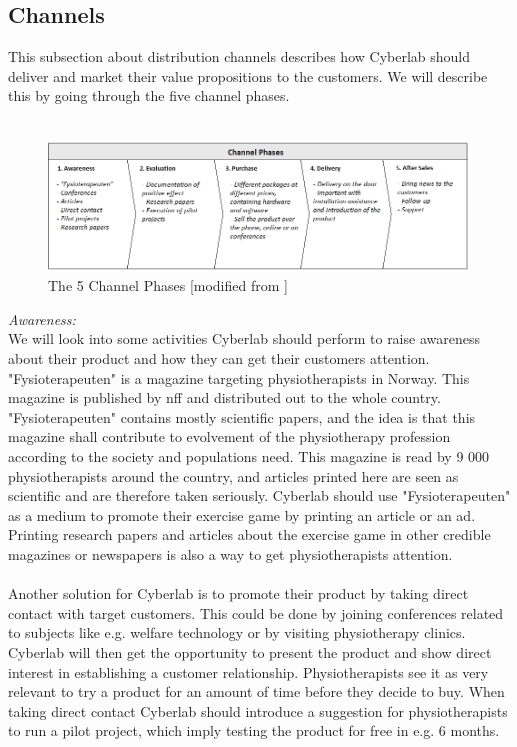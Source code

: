\subsection{Channels}
This subsection about distribution channels describes how Cyberlab should deliver and market their value propositions to the customers. We will describe this by going through the five channel phases.\\ \\
\begin{figure}
\label{fig:Channels}
\begin{center}
\includegraphics[angle=90,scale=0.7]{channels}
\caption[Channels]{The 5 Channel Phases [modified from \cite{osterwalder}\cite{osterwalderthesis}]}
\end{center}
\end{figure}
\emph{Awareness:} \\ 
We will look into some activities Cyberlab should perform to raise awareness about their product and how they can get their customers attention. "Fysioterapeuten" is a magazine targeting physiotherapists in Norway. This magazine is published by \ac{nff} and distributed out to the whole country. "Fysioterapeuten" contains mostly scientific papers, and the idea is that this magazine shall contribute to evolvement of the physiotherapy profession according to the society and populations need. This magazine is read by 9 000 physiotherapists around the country, and articles printed here are seen as scientific and are therefore taken seriously. Cyberlab should use "Fysioterapeuten" as a medium to promote their exercise game by printing an article or an ad. Printing research papers and articles about the exercise game in other credible magazines or newspapers is also a way to get physiotherapists attention. \\ \\
Another solution for Cyberlab is to promote their product by taking direct contact with target customers. This could be done by joining conferences related to subjects like e.g. welfare technology or by visiting physiotherapy clinics. Cyberlab will then get the opportunity to present the product and show direct interest in establishing a customer relationship. Physiotherapists see it as very relevant to try a product for an amount of time before they decide to buy. When taking direct contact Cyberlab should introduce a suggestion for physiotherapists to run a pilot project, which imply testing the product for free in e.g. 6 months. \\ \\
